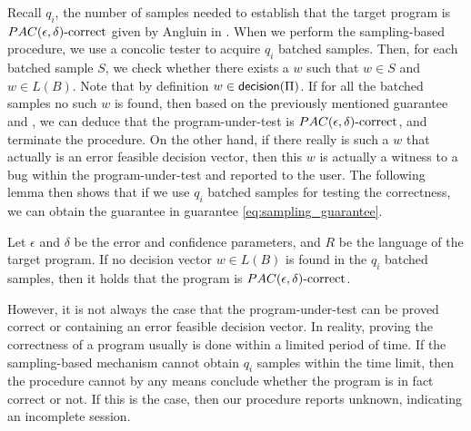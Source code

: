 Recall $q_i$, the number of samples needed to establish that the target program is $PAC(\epsilon, \delta)\text{-correct}$ given by Angluin in \cite{Angluin87}. When we perform the sampling-based procedure, we use a concolic tester to acquire $q_i$ batched samples. Then, for each batched sample $S$, we check whether there exists a $w$ such that $w \in S$ and $w \in L(B)$. Note that by definition $w \in \mathsf{decision}(\Pi)$. If for all the batched samples no such $w$ is found, then based on the previously mentioned guarantee and \cite{Angluin87}, we can deduce that the program-under-test is $PAC(\epsilon, \delta)\text{-correct}$, and terminate the procedure. On the other hand, if there really is such a $w$ that actually is an error feasible decision vector, then this $w$ is actually a witness to a bug within the program-under-test and reported to the user. The following lemma then shows that if we use $q_i$ batched samples for testing the correctness, we can obtain the guarantee in guarantee \ref{eq:sampling_guarantee}.

\begin{lemma}
Let $\epsilon$ and $\delta$ be the error and confidence parameters, and $R$ be the language of the target program. If no decision vector $w \in L(B)$ is found in the $q_i$ batched samples, then it holds that the program is $PAC(\epsilon, \delta)\text{-correct}$.
\end{lemma}

However, it is not always the case that the program-under-test can be proved correct or containing an error feasible decision vector. In reality, proving the correctness of a program usually is done within a limited period of time. If the sampling-based mechanism cannot obtain $q_i$ samples within the time limit, then the procedure cannot by any means conclude whether the program is in fact correct or not. If this is the case, then our procedure reports unknown, indicating an incomplete session. 